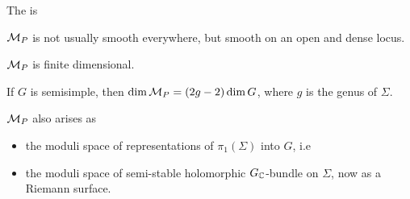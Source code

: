 \documentclass{article}
\begin{document}
\begin{definition}
	The  is 
\end{definition}

\begin{remark}
	$\mathcal{M}_P$ is not usually smooth everywhere, but smooth on an open and dense locus.
\end{remark}

\begin{prop}
	$\mathcal{M}_P$ is finite dimensional. 
\end{prop}

\begin{example}
	If $G$ is semisimple, then $\dim \mathcal{M}_P = (2g-2)\dim G$, where $g$ is the genus of $\Sigma$.  
\end{example}

\begin{remark}
	$\mathcal{M}_P$ also arises as 
	\begin{itemize}
		\item the moduli space of representations of $\pi_1(\Sigma)$ into $G$, i.e 
\item the moduli space of semi-stable holomorphic $G_{\mathbb{C}}$-bundle on $\Sigma$, now as a Riemann surface. 
	\end{itemize}
\end{remark}



\end{document}
